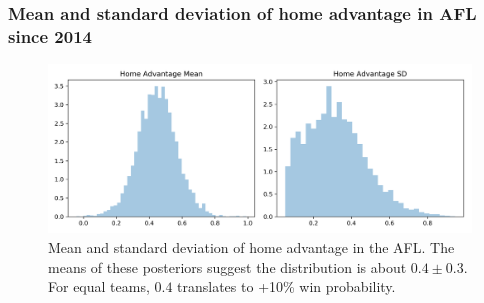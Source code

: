 \documentclass{beamer}
\begin{document}
\begin{frame}
\frametitle{Mean and standard deviation of home advantage in AFL since 2014}
\begin{figure}
	\includegraphics[width=\textwidth]{mean_var_home_ad}	
	\caption{Mean and standard deviation of home advantage in the AFL. The means of these posteriors suggest the distribution is about $0.4 \pm 0.3$. For equal teams, $0.4$ translates to +10\% win probability.}
\end{figure}
\end{frame}
\end{document}
